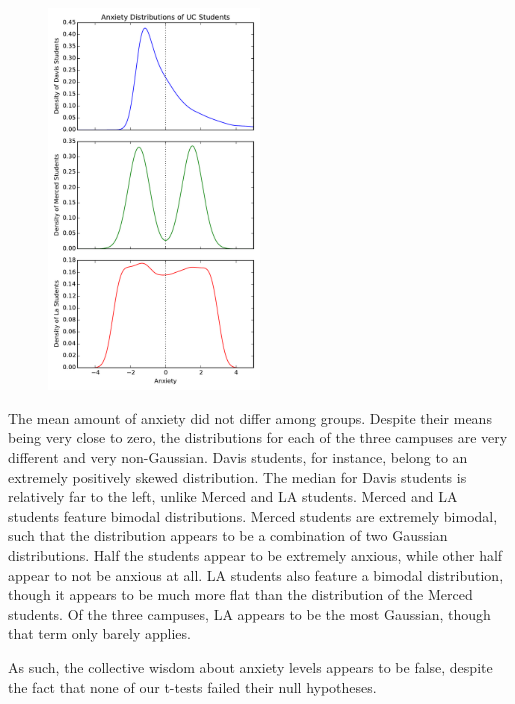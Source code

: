 \documentclass[onecolumn,10pt]{jhwhw}
\begin{document}
\begin{figure}
  \begin{center}
    \includegraphics[width=0.5\textwidth]{figures/problem5.pdf}
  \end{center}
\end{figure}

The mean amount of anxiety did not differ among groups. Despite their means being very close to zero, the distributions for each of the three campuses are very different and very non-Gaussian. Davis students, for instance, belong to an extremely positively skewed distribution. The median for Davis students is relatively far to the left, unlike Merced and LA students. Merced and LA students feature bimodal distributions. Merced students are extremely bimodal, such that the distribution appears to be a combination of two Gaussian distributions. Half the students appear to be extremely anxious, while other half appear to not be anxious at all. LA students also feature a bimodal distribution, though it appears to be much more flat than the distribution of the Merced students. Of the three campuses, LA appears to be the most Gaussian, though that term only barely applies.

As such, the collective wisdom about anxiety levels appears to be false, despite the fact that none of our t-tests failed their null hypotheses.
\end{document}

